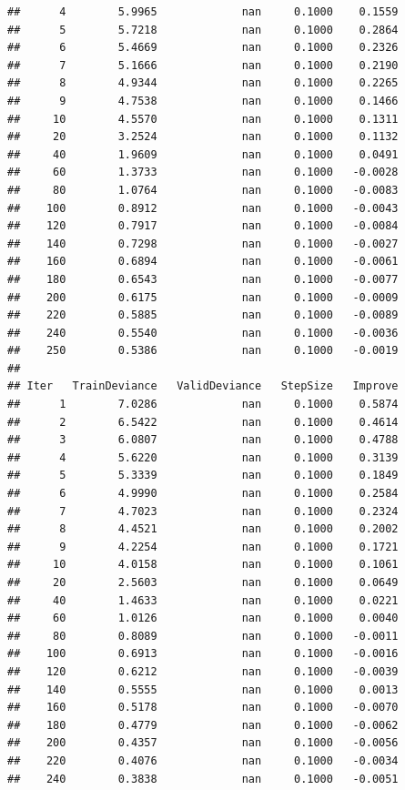\documentclass[]{book}
\begin{document}
\begin{verbatim}
##      4        5.9965             nan     0.1000    0.1559
##      5        5.7218             nan     0.1000    0.2864
##      6        5.4669             nan     0.1000    0.2326
##      7        5.1666             nan     0.1000    0.2190
##      8        4.9344             nan     0.1000    0.2265
##      9        4.7538             nan     0.1000    0.1466
##     10        4.5570             nan     0.1000    0.1311
##     20        3.2524             nan     0.1000    0.1132
##     40        1.9609             nan     0.1000    0.0491
##     60        1.3733             nan     0.1000   -0.0028
##     80        1.0764             nan     0.1000   -0.0083
##    100        0.8912             nan     0.1000   -0.0043
##    120        0.7917             nan     0.1000   -0.0084
##    140        0.7298             nan     0.1000   -0.0027
##    160        0.6894             nan     0.1000   -0.0061
##    180        0.6543             nan     0.1000   -0.0077
##    200        0.6175             nan     0.1000   -0.0009
##    220        0.5885             nan     0.1000   -0.0089
##    240        0.5540             nan     0.1000   -0.0036
##    250        0.5386             nan     0.1000   -0.0019
## 
## Iter   TrainDeviance   ValidDeviance   StepSize   Improve
##      1        7.0286             nan     0.1000    0.5874
##      2        6.5422             nan     0.1000    0.4614
##      3        6.0807             nan     0.1000    0.4788
##      4        5.6220             nan     0.1000    0.3139
##      5        5.3339             nan     0.1000    0.1849
##      6        4.9990             nan     0.1000    0.2584
##      7        4.7023             nan     0.1000    0.2324
##      8        4.4521             nan     0.1000    0.2002
##      9        4.2254             nan     0.1000    0.1721
##     10        4.0158             nan     0.1000    0.1061
##     20        2.5603             nan     0.1000    0.0649
##     40        1.4633             nan     0.1000    0.0221
##     60        1.0126             nan     0.1000    0.0040
##     80        0.8089             nan     0.1000   -0.0011
##    100        0.6913             nan     0.1000   -0.0016
##    120        0.6212             nan     0.1000   -0.0039
##    140        0.5555             nan     0.1000    0.0013
##    160        0.5178             nan     0.1000   -0.0070
##    180        0.4779             nan     0.1000   -0.0062
##    200        0.4357             nan     0.1000   -0.0056
##    220        0.4076             nan     0.1000   -0.0034
##    240        0.3838             nan     0.1000   -0.0051

\end{verbatim}
\end{document}
